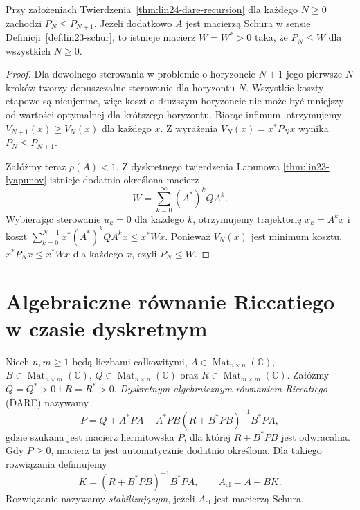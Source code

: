 \begin{stwierdzenie}
\label{prop:lin24-discrete-mono}
Przy założeniach
Twierdzenia~\ref{thm:lin24-dare-recursion}
dla każdego \(N\ge0\)
zachodzi \(P_N\le P_{N+1}\).
Jeżeli dodatkowo \(A\)
jest macierzą Schura
w sensie
Definicji~\ref{def:lin23-schur},
to istnieje macierz \(W=W^*>0\)
taka, że \(P_N\le W\)
dla wszystkich \(N\ge0\).
\end{stwierdzenie}
\begin{proof}
Dla dowolnego sterowania
w problemie o horyzoncie \(N+1\)
jego pierwsze \(N\) kroków
tworzy dopuszczalne sterowanie
dla horyzontu \(N\).
Wszystkie koszty etapowe
są nieujemne, więc koszt
o dłuższym horyzoncie
nie może być mniejszy
od wartości optymalnej
dla krótszego horyzontu.
Biorąc infimum, otrzymujemy
\(V_{N+1}(x)\ge V_N(x)\)
dla każdego \(x\).
Z wyrażenia
\(V_N(x)=x^*P_Nx\)
wynika \(P_N\le P_{N+1}\).

Załóżmy teraz \(\rho(A)<1\).
Z dyskretnego twierdzenia
Lapunowa
\ref{thm:lin23-lyapunov}
istnieje dodatnio określona
macierz
\[
 W=\sum_{k=0}^{\infty}(A^*)^kQA^k.
\]
Wybierając sterowanie
\(u_k=0\) dla każdego \(k\),
otrzymujemy trajektorię
\(x_k=A^kx\) i koszt
\(\sum_{k=0}^{N-1}x^*(A^*)^kQA^kx
 \le x^*Wx\).
Ponieważ \(V_N(x)\)
jest minimum kosztu,
\(x^*P_Nx\le x^*Wx\)
dla każdego \(x\),
czyli \(P_N\le W\).
\end{proof}

\section{Algebraiczne równanie Riccatiego w czasie dyskretnym}
\label{sec:lin24-dare}

\begin{definicja}
\label{def:lin24-dare}
Niech \(n,m\ge1\) będą liczbami całkowitymi,
\(A\in\operatorname{Mat}_{n\times n}(\mathbb C)\),
\(B\in\operatorname{Mat}_{n\times m}(\mathbb C)\),
\(Q\in\operatorname{Mat}_{n\times n}(\mathbb C)\)
oraz \(R\in\operatorname{Mat}_{m\times m}(\mathbb C)\).
Załóżmy \(Q=Q^*>0\) i \(R=R^*>0\).
\emph{Dyskretnym algebraicznym
równaniem Riccatiego} (DARE) nazywamy
\[
 P=Q+A^*PA-
 A^*PB(R+B^*PB)^{-1}B^*PA,
\]
gdzie szukana jest macierz
hermitowska \(P\),
dla której \(R+B^*PB\)
jest odwracalna.
Gdy \(P\ge0\), macierz ta
jest automatycznie
dodatnio określona.
Dla takiego rozwiązania
definiujemy
\[
 K=(R+B^*PB)^{-1}B^*PA,
 \qquad A_{\mathrm{cl}}=A-BK.
\]
Rozwiązanie nazywamy
\emph{stabilizującym},
jeżeli \(A_{\mathrm{cl}}\)
jest macierzą Schura.
\end{definicja}

